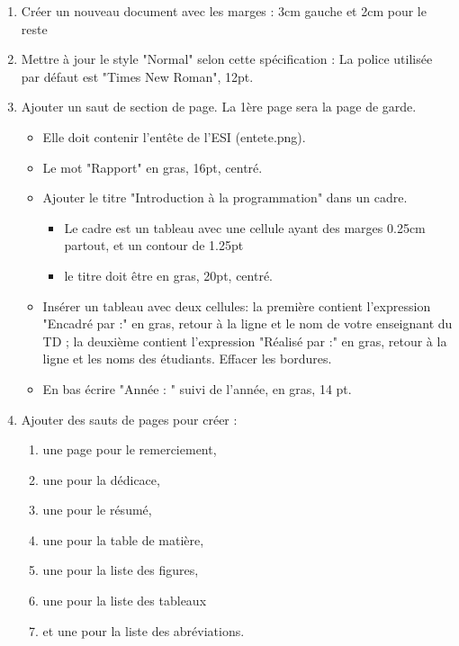 \documentclass[11pt, a4paper]{article}
\begin{document}
\begin{enumerate}
	\item Créer un nouveau document avec les marges : 3cm gauche et 2cm pour le reste 
	\item Mettre à jour le style "Normal" selon cette spécification : La police utilisée par défaut est "Times New Roman", 12pt.
	\item Ajouter un saut de section de page. La 1ère page sera la page de garde.  
	\begin{multicols}{2}
	\begin{itemize}
		\item Elle doit contenir l'entête de l'ESI (entete.png). 
		\item Le mot "Rapport" en gras, 16pt, centré. 
		\item Ajouter le titre "Introduction à la programmation" dans un cadre. 
		\begin{itemize}
			\item Le cadre est un tableau avec une cellule ayant des marges 0.25cm partout, et un contour de 1.25pt
			\item le titre doit être en gras, 20pt, centré.
		\end{itemize}
		\item Insérer un tableau avec deux cellules: la première contient l'expression "Encadré par :" en gras, retour à la ligne et le nom de votre enseignant du TD ; la deuxième contient l'expression "Réalisé par :" en gras, retour à la ligne et les noms des étudiants. Effacer les bordures.
		\item En bas écrire "Année : " suivi de l'année, en gras, 14 pt.
	\end{itemize}
	\end{multicols}

	\item Ajouter des sauts de pages pour créer :  
	\begin{multicols}{3}
		\begin{enumerate}
			\item une page pour le remerciement, 
			\item une pour la dédicace, 
			\item une pour le résumé, 
			\item une pour la table de matière, 
			\item une pour la liste des figures, 
			\item une pour la liste des tableaux 
			\item et une pour la liste des abréviations.
		\end{enumerate}
	\end{multicols}
	

\end{enumerate}
\end{document}
